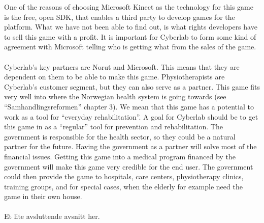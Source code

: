 One of the reasons of choosing Microsoft Kinect as the technology for this game is the free, open SDK, that enables a third party to develop games for the platform. What we have not been able to find out, is what rights developers have to sell this game with a profit. It is important for Cyberlab to form some kind of agreement with Microsoft telling who is getting what from the sales of the game. \\ \\
Cyberlab’s key partners are Norut and Microsoft. This means that they are dependent on them to be able to make this game.
Physiotherapists are Cyberlab's customer segment, but they can also serve as a partner. This game fits very well into where the Norwegian health system is going towards (see “Samhandlingsreformen” chapter 3). We mean that this game has a potential to work as a tool for “everyday rehabilitation”. A goal for Cyberlab should be to get this game in as a “regular” tool for prevention and rehabilitation. The government is responsible for the health sector, so they could be a natural partner for the future. Having the government as a partner will solve most of the financial issues. Getting this game into a medical program financed by the government will make this game very credible for the end user. The government could then provide the game to hospitals, care centers, physiotherapy clinics, training groups, and for special cases, when the elderly for example need the game in their own house. \\ \\ 
Et lite avsluttende avsnitt her.
